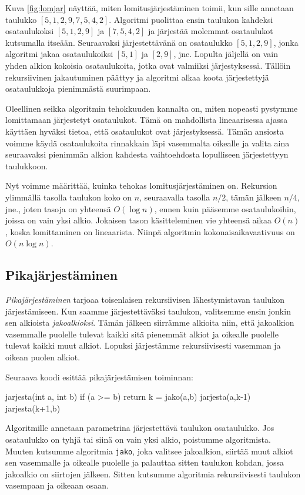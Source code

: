 Kuva \ref{fig:lomjar} näyttää, miten lomitusjärjestäminen
toimii, kun sille annetaan taulukko $[5,1,2,9,7,5,4,2]$.
Algoritmi puolittaa ensin taulukon kahdeksi osataulukoksi
$[5,1,2,9]$ ja $[7,5,4,2]$ ja järjestää molemmat
osataulukot kutsumalla itseään.
Seuraavaksi järjestettävänä on osataulukko $[5,1,2,9]$,
jonka algoritmi jakaa osataulukoiksi $[5,1]$ ja $[2,9]$, jne.
Lopulta jäljellä on vain yhden alkion kokoisia
osataulukoita, jotka ovat valmiiksi järjestyksessä.
Tällöin rekursiivinen jakautuminen päättyy ja algoritmi
alkaa koota järjestettyjä osataulukkoja pienimmästä suurimpaan.

Oleellinen seikka algoritmin tehokkuuden kannalta on,
miten nopeasti pystymme lomittamaan järjestetyt osataulukot.
Tämä on mahdollista lineaarisessa ajassa käyttäen hyväksi tietoa,
että osataulukot ovat järjestyksessä.
Tämän ansiosta voimme käydä osataulukoita rinnakkain läpi
vasemmalta oikealle ja valita aina seuraavaksi pienimmän alkion
kahdesta vaihtoehdosta lopulliseen järjestettyyn taulukkoon.

Nyt voimme määrittää, kuinka tehokas lomitusjärjestäminen on.
Rekursion ylimmällä tasolla taulukon koko on $n$,
seuraavalla tasolla $n/2$, tämän jälkeen $n/4$, jne.,
joten tasoja on yhteensä $O(\log n)$, ennen kuin pääsemme
osataulukoihin, joissa on vain yksi alkio.
Jokaisen tason käsitteleminen vie yhteensä aikaa $O(n)$,
koska lomittaminen on lineaarista.
Niinpä algoritmin kokonaisaikavaativuus on $O(n \log n)$.

\subsection{Pikajärjestäminen}

\emph{Pikajärjestäminen} tarjoaa toisenlaisen rekursiivisen
lähestymistavan taulukon järjestämiseen.
Kun saamme järjestettäväksi taulukon, valitsemme ensin jonkin
sen alkioista \emph{jakoalkioksi}.
Tämän jälkeen siirrämme alkioita niin,
että jakoalkion vasemmalle puolelle tulevat kaikki sitä pienemmät alkiot
ja oikealle puolelle tulevat kaikki muut alkiot.
Lopuksi järjestämme rekursiivisesti vasemman ja oikean puolen alkiot.

Seuraava koodi esittää pikajärjestämisen toiminnan:

\begin{code}
jarjesta(int a, int b)
    if (a >= b)
        return
    k = jako(a,b)
    jarjesta(a,k-1)
    jarjesta(k+1,b)
\end{code}

Algoritmille annetaan parametrina järjestettävä
taulukon osataulukko.
Jos osataulukko on tyhjä tai siinä on vain yksi alkio,
poistumme algoritmista.
Muuten kutsumme algoritmia \texttt{jako}, joka valitsee jakoalkion,
siirtää muut alkiot sen vasemmalle ja oikealle puolelle
ja palauttaa sitten taulukon kohdan, jossa jakoalkio on siirtojen jälkeen.
Sitten kutsumme algoritmia rekursiivisesti
taulukon vasempaan ja oikeaan osaan.


